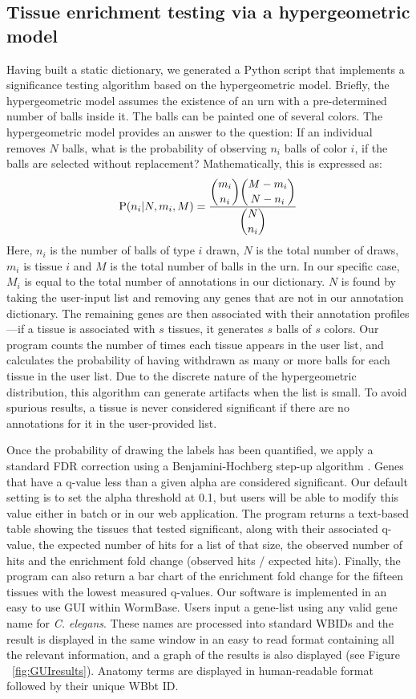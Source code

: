 \documentclass{bmcart}
\begin{document}
\subsection*{Tissue enrichment testing via a hypergeometric model}
	Having built a static dictionary, we generated a Python script that implements a significance testing algorithm based on the hypergeometric model. Briefly, the hypergeometric model assumes the existence of an urn with a pre-determined number of balls inside it. The balls can be painted one of several colors. The hypergeometric model provides an answer to the question: If an individual removes $N$ balls, what is the probability of observing $n_i$ balls of color $i$, if the balls are selected without replacement? Mathematically, this is expressed as:
\begin{eqnarray}\label{hypergeometric}
	\mathrm{P}(n_i | N, m_i, M) = \frac{\dbinom{m_i}{n_i} \dbinom{M-m_i}{N - n_i}}{\dbinom{N}{n_i}}
\end{eqnarray}
	Here, $n_i$ is the number of balls of type $i$ drawn, $N$ is the total number of draws, $m_i$ is tissue $i$ and $M$ is the total number of balls in the urn. In our specific case, $M_i$ is equal to the total number of annotations in our dictionary. $N$ is found by taking the user-input list and removing any genes that are not in our annotation dictionary. The remaining genes are then associated with their annotation profiles---if a tissue is associated with $s$ tissues, it generates $s$ balls of $s$ colors. Our program counts the number of times each tissue appears in the user list, and calculates the probability of having withdrawn as many or more balls for each tissue in the user list. Due to the discrete nature of the hypergeometric distribution, this algorithm can generate artifacts when the list is small. To avoid spurious results, a tissue is never considered significant if there are no annotations for it in the user-provided list.

	Once the probability of drawing the labels has been quantified, we apply a standard FDR correction using a Benjamini-Hochberg step-up algorithm \cite{Benjamini1995}. Genes that have a q-value less than a given alpha are considered significant. Our default setting is to set the alpha threshold at 0.1, but users will be able to modify this value either in batch or in our web application. The program returns a text-based table showing the tissues that tested significant, along with their associated q-value, the expected number of hits for a list of that size, the observed number of hits and the enrichment fold change (observed hits / expected hits). Finally, the program can also return a bar chart of the enrichment fold change for the fifteen tissues with the lowest measured q-values.
	Our software is implemented in an easy to use GUI within WormBase. Users input a gene-list using any valid gene name for  \emph{C. elegans}. These names are processed into standard WBIDs and the result is displayed in the same window in an easy to read format containing all the relevant information, and a graph of the results is also displayed (see Figure ~\ref{fig:GUIresults}). Anatomy terms are displayed in human-readable format followed by their unique WBbt ID. 
\end{document}
